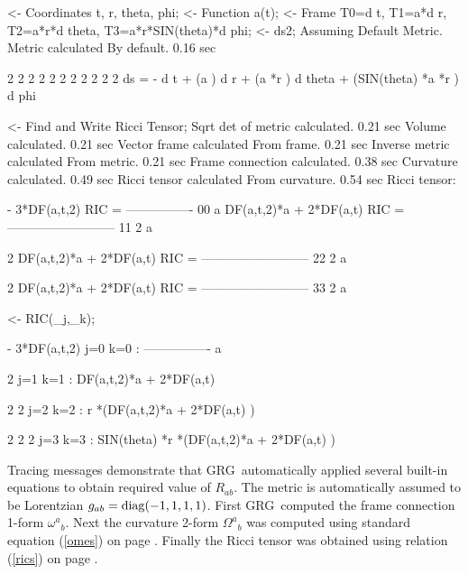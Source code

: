 \documentclass[twoside,openright]{report}
\newcommand{\grg}{{\sc GRG}}
\begin{document}
\begin{slisting}
<- Coordinates t, r, theta, phi;
<- Function a(t);
<- Frame T0=d t, T1=a*d r, T2=a*r*d theta, T3=a*r*SIN(theta)*d phi;
<- ds2;
Assuming Default Metric.
Metric calculated By default. 0.16 sec

   2          2     2     2     2  2         2              2  2  2       2
 ds  =  -  d t  + (a ) d r  + (a *r ) d theta  + (SIN(theta) *a *r ) d phi

<- Find and Write Ricci Tensor;
Sqrt det of metric calculated. 0.21 sec
Volume calculated. 0.21 sec
Vector frame calculated From frame. 0.21 sec
Inverse metric calculated From metric. 0.21 sec
Frame connection calculated. 0.38 sec
Curvature calculated. 0.49 sec
Ricci tensor calculated From curvature. 0.54 sec
Ricci tensor:

          - 3*DF(a,t,2)
RIC   = ----------------
   00          a
         DF(a,t,2)*a + 2*DF(a,t)
RIC   = --------------------------
   11                2
                    a

                                2
         DF(a,t,2)*a + 2*DF(a,t)
RIC   = --------------------------
   22                2
                    a

                                2
         DF(a,t,2)*a + 2*DF(a,t)
RIC   = --------------------------
   33                2
                    a

<- RIC(_j,_k);

            - 3*DF(a,t,2)
j=0 k=0 : ----------------
                 a

                                 2
j=1 k=1 : DF(a,t,2)*a + 2*DF(a,t)

           2                         2
j=2 k=2 : r *(DF(a,t,2)*a + 2*DF(a,t) )

                    2  2                         2
j=3 k=3 : SIN(theta) *r *(DF(a,t,2)*a + 2*DF(a,t) )
\end{slisting}
Tracing messages demonstrate that \grg\ automatically
applied several built-in equations to obtain required value of
$R_{ab}$. The metric          is automatically assumed to be
Lorentzian $g_{ab}={\rm diag}(-1,1,1,1)$.
First \grg\ computed the frame connection 1-form $\omega^a{}_b$.
Next the curvature 2-form $\Omega^a{}_b$ was computed using
standard equation (\ref{omes}) on page \pageref{omes}.
Finally the Ricci tensor was obtained using
relation (\ref{rics}) on page \pageref{rics}.
\end{document}
